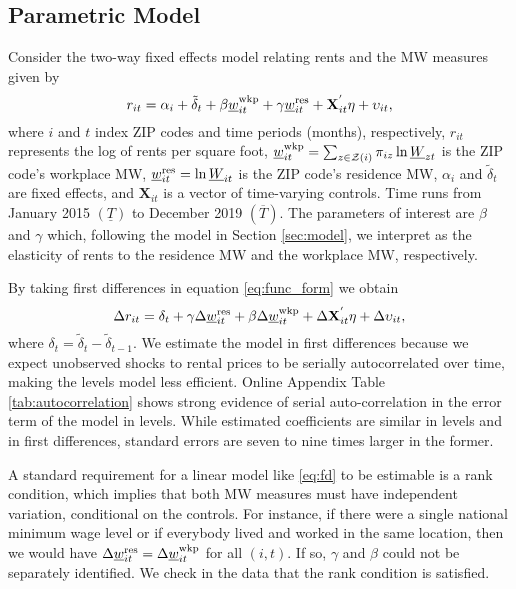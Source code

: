 \subsection{Parametric Model}

Consider the two-way fixed effects model relating rents and the MW measures
given by
\begin{equation} \label{eq:func_form}
    r_{it} = \alpha_i + \tilde{\delta}_t 
           + \beta \underline{w}^{\text{wkp}}_{it} + \gamma \underline{w}^{\text{res}}_{it} 
           + \mathbf{X}^{'}_{it}\eta
           + \upsilon_{it} ,
\end{equation}    
where
$i$ and $t$ index ZIP codes and time periods (months), respectively,
$r_{it}$ represents the log of rents per square foot,
$\underline{w}^{\text{wkp}}_{it} = \sum_{z\in\mathcal{Z}(i)} \pi_{iz}\ln \underline{W}_{zt}$ is the ZIP code's 
workplace MW,
$\underline{w}^{\text{res}}_{it} = \ln \underline{W}_{it}$ is the ZIP code's residence MW,
$\alpha_i$ and $\tilde{\delta}_t$ are fixed effects, and 
$\mathbf{X}_{it}$ is a vector of time-varying controls.
Time runs from January 2015 $\left(\underline{T}\right)$ 
to December 2019 $\left(\overline{T}\right)$.
The parameters of interest are $\beta$ and $\gamma$ which, 
following the model in Section \ref{sec:model}, 
we interpret as the elasticity of rents to the residence MW and the workplace MW, 
respectively.

By taking first differences in equation \eqref{eq:func_form} we obtain
\begin{equation}\label{eq:fd}
    \Delta r_{it} = \delta_t
                  + \gamma \Delta \underline{w}^{\text{res}}_{it} + \beta \Delta \underline{w}^{\text{wkp}}_{it}
                  + \Delta \mathbf{X}^{'}_{it}\eta
                  + \Delta \upsilon_{it} ,
\end{equation}
where $\delta_t = \tilde{\delta}_t - \tilde{\delta}_{t-1}$.
We estimate the model in first differences because we expect unobserved shocks
to rental prices to be serially autocorrelated over time, making the levels
model less efficient.
Online Appendix Table \ref{tab:autocorrelation} shows strong evidence of serial 
auto-correlation in the error term of the model in levels.
While estimated coefficients are similar in levels and in first differences, 
standard errors are seven to nine times larger in the former.

A standard requirement for a linear model like \eqref{eq:fd} to be
estimable is a rank condition, which implies that both MW measures must have 
independent variation, conditional on the controls.
For instance, if there were a single national minimum wage level or if everybody 
lived and worked in the same location, then we would have
$\Delta \underline{w}^{\text{res}}_{it} = \Delta \underline{w}^{\text{wkp}}_{it}$ for all $(i,t)$.
If so, $\gamma$ and $\beta$ could not be separately identified.
We check in the data that the rank condition is satisfied.

